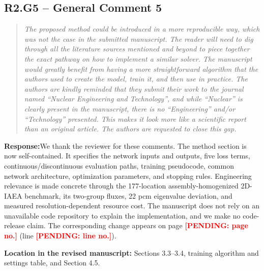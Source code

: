 \documentclass[11pt,a4paper]{article}
\newenvironment{reviewercomment}{\begin{quote}\small\itshape\color{commentgray}}{\end{quote}}
\newcommand{\authorresponse}{\noindent\textbf{Response:}\quad}
\newcommand{\revisionlocation}[1]{\par\noindent\textcolor{locationblue}{\textbf{Location in the revised manuscript: }}#1}
\newcommand{\draftplaceholder}[1]{\textcolor{red}{\textbf{[PENDING: #1]}}}
\begin{document}
\subsection*{R2.G5 -- General Comment 5}
\begin{reviewercomment}
The proposed method could be introduced in a more reproducible way, which was not the case in the submitted manuscript. The reader will need to dig through all the literature sources mentioned and beyond to piece together the exact pathway on how to implement a similar solver. The manuscript would greatly benefit from having a more straightforward algorithm that the authors used to create the model, train it, and then use in practice. The authors are kindly reminded that they submit their work to the journal named ``Nuclear Engineering and Technology'', and while ``Nuclear'' is clearly present in the manuscript, there is no ``Engineering'' and/or ``Technology'' presented. This makes it look more like a scientific report than an original article. The authors are requested to close this gap.
\end{reviewercomment}
\authorresponse We thank the reviewer for these comments. The method section is now self-contained. It specifies the network inputs and outputs, five loss terms, continuous/discontinuous evaluation paths, training pseudocode, common network architecture, optimization parameters, and stopping rules. Engineering relevance is made concrete through the 177-location assembly-homogenized 2D-IAEA benchmark, its two-group fluxes, 22 pcm eigenvalue deviation, and measured resolution-dependent resource cost. The manuscript does not rely on an unavailable code repository to explain the implementation, and we make no code-release claim. The corresponding change appears on page \draftplaceholder{page no.} (line \draftplaceholder{line no.}).
\revisionlocation{Sections 3.3--3.4, training algorithm and settings table, and Section 4.5.}
\end{document}
